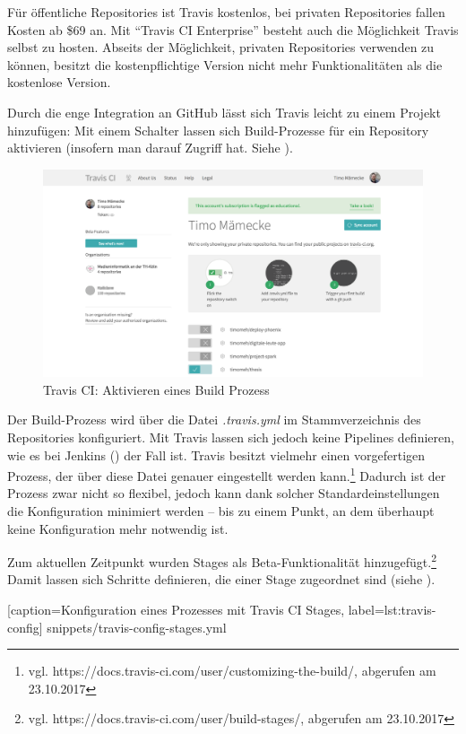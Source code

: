 Für öffentliche Repositories ist Travis kostenlos, bei privaten Repositories fallen Kosten ab \$69 an. Mit ``Travis CI Enterprise'' besteht auch die Möglichkeit Travis selbst zu hosten. Abseits der Möglichkeit, privaten Repositories verwenden zu können, besitzt die kostenpflichtige Version nicht mehr Funktionalitäten als die kostenlose Version.

Durch die enge Integration an GitHub lässt sich Travis leicht zu einem Projekt hinzufügen: Mit einem Schalter lassen sich Build-Prozesse für ein Repository aktivieren (insofern man darauf Zugriff hat. Siehe ).

\begin{figure}[h]
  \caption{Travis CI: Aktivieren eines Build Prozess}
  \label{fig:travis-activate}
  \includegraphics[width=.8\textwidth]{assets/travis-activate}
\end{figure}

Der Build-Prozess wird über die Datei \emph{.travis.yml} im Stammverzeichnis des Repositories konfiguriert. Mit Travis lassen sich jedoch keine Pipelines definieren, wie es bei Jenkins () der Fall ist. Travis besitzt vielmehr einen vorgefertigen Prozess, der über diese Datei genauer eingestellt werden kann.\footnote{vgl. https://docs.travis-ci.com/user/customizing-the-build/, abgerufen am 23.10.2017} Dadurch ist der Prozess zwar nicht so flexibel, jedoch kann dank solcher Standardeinstellungen die Konfiguration minimiert werden – bis zu einem Punkt, an dem überhaupt keine Konfiguration mehr notwendig ist.

Zum aktuellen Zeitpunkt wurden Stages als Beta-Funktionalität hinzugefügt.\footnote{vgl. https://docs.travis-ci.com/user/build-stages/, abgerufen am 23.10.2017} Damit lassen sich Schritte definieren, die einer Stage zugeordnet sind (siehe ).


  [caption={Konfiguration eines Prozesses mit Travis CI Stages},
  label={lst:travis-config}]
  {snippets/travis-config-stages.yml}

